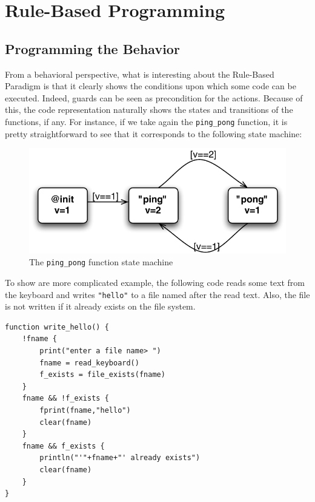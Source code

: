 \documentclass{sig-alternate}
\begin{document}
\section{Rule-Based Programming}

\subsection{Programming the Behavior}

From a behavioral perspective, what is interesting about the Rule-Based Paradigm is that it clearly shows the conditions upon which some code can be executed. Indeed, guards can be seen as precondition for the actions. Because of this, the code representation naturally shows the states and transitions of the functions, if any. For instance, if we take again the \texttt{ping\_pong} function, it is pretty straightforward to see that it corresponds to the following state machine:

\begin{figure}[htbp]
\begin{center}
\includegraphics[scale=0.6]{ping_pong_sm.pdf} 
\caption{The \texttt{ping\_pong} function state machine}
\label{default}
\end{center}
\end{figure}

To show are more complicated example, the following code reads some text from the keyboard and writes \texttt{"hello"} to a file named after the read text. Also, the file is not written if it already exists on the file system.

\begin{lstlisting}
function write_hello() {
	!fname {
		print("enter a file name> ")
		fname = read_keyboard()
		f_exists = file_exists(fname)
	}
	fname && !f_exists {
		fprint(fname,"hello")
		clear(fname)
	}
	fname && f_exists {
		println("'"+fname+"' already exists")
		clear(fname)
	}
}
\end{lstlisting}
\end{document}
